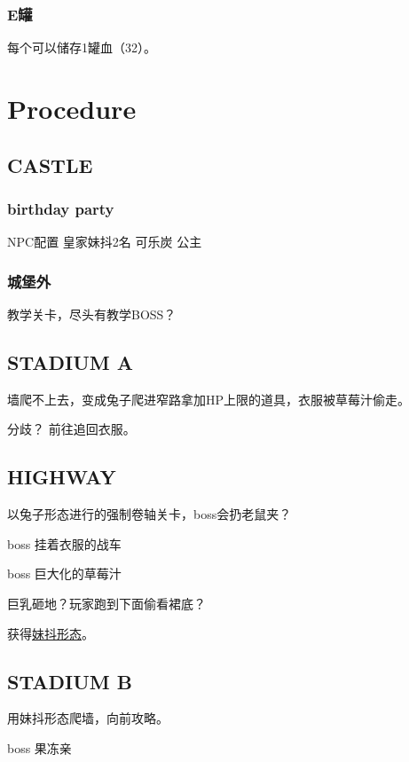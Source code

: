 \documentclass{article}
\begin{document}
\subsubsection{E罐}

每个可以储存1罐血（32）。

\section{Procedure}

\subsection{CASTLE}

\subsubsection{birthday party}

NPC配置 皇家妹抖2名 可乐炭 公主

\subsubsection{城堡外}

教学关卡，尽头有教学BOSS？

\subsection{STADIUM A}

墙爬不上去，变成兔子爬进窄路拿加HP上限的道具，衣服被草莓汁偷走。

分歧？ 前往追回衣服。

\subsection{HIGHWAY}

以兔子形态进行的强制卷轴关卡，boss会扔老鼠夹？

boss 挂着衣服的战车

boss 巨大化的草莓汁

巨乳砸地？玩家跑到下面偷看裙底？

获得\hyperref[costume_maid]{妹抖形态}。

\subsection{STADIUM B}

用妹抖形态爬墙，向前攻略。

boss 果冻亲
\end{document}
